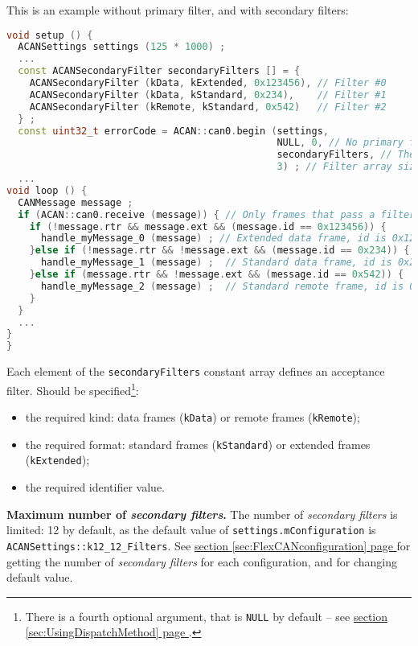 \documentclass[9pt, a4paper, obeyspaces, openany]{extarticle}
\newcommand\refSectionPage[1]{\hyperref[sec:#1]{section \ref*{sec:#1} page \pageref{sec:#1}}}
\begin{document}
This is an example without primary filter, and with secondary filters:
{ \small\begin{lstlisting}[language=c++]
void setup () {
  ACANSettings settings (125 * 1000) ;
  ...
  const ACANSecondaryFilter secondaryFilters [] = {
    ACANSecondaryFilter (kData, kExtended, 0x123456), // Filter #0
    ACANSecondaryFilter (kData, kStandard, 0x234),    // Filter #1
    ACANSecondaryFilter (kRemote, kStandard, 0x542)   // Filter #2
  } ;
  const uint32_t errorCode = ACAN::can0.begin (settings,
                                               NULL, 0, // No primary filter
                                               secondaryFilters, // The filter array
                                               3) ; // Filter array size
  ...
void loop () {
  CANMessage message ;
  if (ACAN::can0.receive (message)) { // Only frames that pass a filter are retrieved
    if (!message.rtr && message.ext && (message.id == 0x123456)) {
      handle_myMessage_0 (message) ; // Extended data frame, id is 0x123456
    }else if (!message.rtr && !message.ext && (message.id == 0x234)) {
      handle_myMessage_1 (message) ;  // Standard data frame, id is 0x234
    }else if (message.rtr && !message.ext && (message.id == 0x542)) {
      handle_myMessage_2 (message) ;  // Standard remote frame, id is 0x542
    }
  }
  ...
}
}
\end{lstlisting}}

Each element of the \texttt{secondaryFilters} constant array defines an acceptance filter. Should be specified\footnote{There is a fourth optional argument, that is \texttt{NULL} by default -- see \refSectionPage{UsingDispatchMethod}.}:
\begin{itemize}
  \item the required kind: data frames (\texttt{kData}) or remote frames (\texttt{kRemote});
  \item the required format: standard frames (\texttt{kStandard}) or extended frames (\texttt{kExtended});
  \item the required identifier value.
\end{itemize}

{\bf Maximum number of \emph{secondary filters}.} The number of \emph{secondary filters} is limited: 12 by default, as the default value of \texttt{settings.mConfiguration} is \texttt{ACANSettings::k12\_12\_Filters}. See \refSectionPage{FlexCANconfiguration} for getting the number of \emph{secondary filters} for each configuration, and for changing default value.
\end{document}
